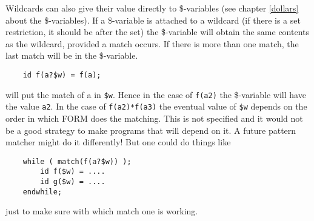Wildcards can also give their value directly to
\$-variables (see chapter
\ref{dollars} about the \$-variables). If a \$-variable is attached to a
wildcard (if there is a set restriction, it should be after the set) the
\$-variable will obtain the same contents as the wildcard, provided a match
occurs. If there is more than one match, the last match will be in the
\$-variable.
\begin{verbatim}
    id f(a?$w) = f(a);
\end{verbatim}
will put the match of a in \verb:$w:. Hence in the case of \verb:f(a2): the 
\$-variable will have the value \verb:a2:. In the case of 
\verb:f(a2)*f(a3): the eventual value of \verb:$w: depends on the order in 
which FORM does the matching. This is not specified and it would not be 
a good strategy to make programs that will depend on it. A future pattern 
matcher might do it differently! But one could do things like
\begin{verbatim}
    while ( match(f(a?$w)) );
        id f($w) = ....
        id g($w) = ....
    endwhile;
\end{verbatim}
just to make sure with which match one is working.

